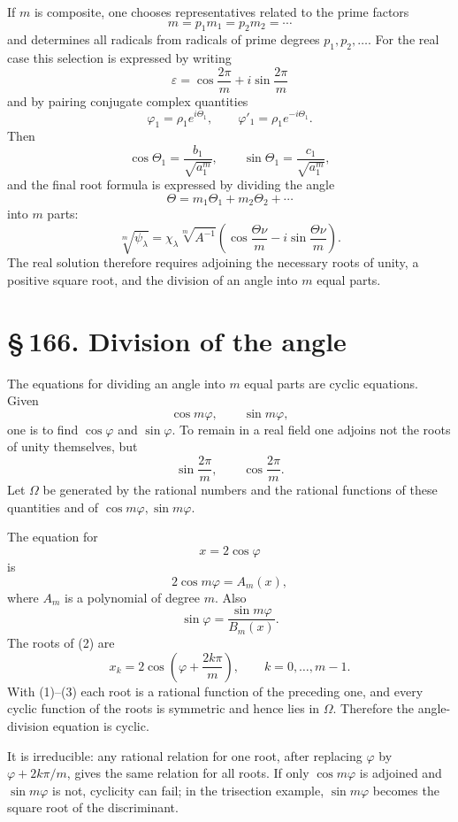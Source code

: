 \documentclass[11pt]{article}
\providecommand{\sect}[2]{\section*{\S\,#1. #2}}
\begin{document}
If $m$ is composite, one chooses representatives related to the prime factors
\[
        m=p_1m_1=p_2m_2=\cdots
\]
and determines all radicals from radicals of prime degrees $p_1,p_2,
\ldots$. For the real case this selection is expressed by writing
\[
        \varepsilon=
        \cos\frac{2\pi}{m}+i\sin\frac{2\pi}{m}
\]
and by pairing conjugate complex quantities
\[
        \varphi_1=\rho_1 e^{i\Theta_1},
        \qquad
        \varphi'_1=\rho_1 e^{-i\Theta_1}.                              \tag{9}
\]
Then
\[
        \cos\Theta_1=\frac{b_1}{\sqrt{a_1^m}},
        \qquad
        \sin\Theta_1=\frac{c_1}{\sqrt{a_1^m}},                           \tag{15}
\]
and the final root formula is expressed by dividing the angle
\[
        \Theta=m_1\Theta_1+
        m_2\Theta_2+
        \cdots                                                          \tag{16}
\]
into $m$ parts:
\[
        \sqrt[m]{\psi_\lambda}
        =\chi_\lambda\sqrt[m]{A^{-1}}
        \left(\cos\frac{\Theta\nu}{m}-i\sin\frac{\Theta\nu}{m}\right).    \tag{21}
\]
The real solution therefore requires adjoining the necessary roots of unity, a positive square root, and the division of an angle into $m$ equal parts.

\sect{166}{Division of the angle}

The equations for dividing an angle into $m$ equal parts are cyclic equations. Given
\[
        \cos m\varphi,
        \qquad
        \sin m\varphi,
\]
one is to find $\cos\varphi$ and $\sin\varphi$. To remain in a real field one adjoins not the roots of unity themselves, but
\[
        \sin\frac{2\pi}{m},
        \qquad
        \cos\frac{2\pi}{m}.                                             \tag{1}
\]
Let $\Omega$ be generated by the rational numbers and the rational functions of these quantities and of $\cos m\varphi,
\sin m\varphi$.

The equation for
\[
        x=2\cos\varphi
\]
is
\[
        2\cos m\varphi=A_m(x),                                         \tag{2}
\]
where $A_m$ is a polynomial of degree $m$. Also
\[
        \sin\varphi=
        \frac{\sin m\varphi}{B_m(x)}.                                  \tag{3}
\]
The roots of (2) are
\[
        x_k=2\cos\left(\varphi+
        \frac{2k\pi}{m}\right),
        \qquad k=0,
        \ldots,m-1.
\]
With (1)--(3) each root is a rational function of the preceding one, and every cyclic function of the roots is symmetric and hence lies in $\Omega$. Therefore the angle-division equation is cyclic.

It is irreducible: any rational relation for one root, after replacing $\varphi$ by $\varphi+2k\pi/m$, gives the same relation for all roots. If only $\cos m\varphi$ is adjoined and $\sin m\varphi$ is not, cyclicity can fail; in the trisection example, $\sin m\varphi$ becomes the square root of the discriminant.
\end{document}
